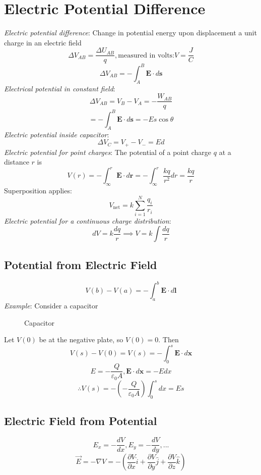 \section{Electric Potential Difference}
\emph{Electric potential difference}: Change in potential energy upon 
displacement a unit charge in an electric field
$$\Delta V_{AB}=\frac{\Delta U_{AB}}{q}, \text{measured in volts:} V=\frac{J}{C}$$
$$\Delta V_{AB} = - \int_A^B\mathbf{E}\cdot d\mathbf{s}$$
\emph{Electrical potential in constant field}:
$$\Delta V_{AB}=V_B-V_A=-\frac{W_{AB}}{q}$$
$$=-\int_A^B\mathbf{E}\cdot d\mathbf{s}=-Es\cos{\theta}$$
\emph{Electric potential inside capacitor}:
$$\Delta V_C = V_+ - V_- = Ed$$
\emph{Electric potential for point charges}: The potential of a point charge $q$ at a distance $r$ is
$$V(r)=-\int_\infty^r\mathbf{E}\cdot d\mathbf{r} = -\int_\infty^r\frac{kq}{r^2}dr=\frac{kq}{r}$$
Superposition applies:
$$V_{\text{net}}=k\sum_{i=1}^N\frac{q_i}{r_i}$$
\emph{Electric potential for a continuous charge distribution}:
$$dV=k\frac{dq}{r}\implies V=k\int\frac{dq}{r}$$
\subsection{Potential from Electric Field}
$$V(b) - V(a)=-\int_a^b\mathbf{E}\cdot d\mathbf{l}$$
\emph{Example}:
Consider a capacitor
\begin{figure}[H]
    \centering
    
    \caption{Capacitor}
\end{figure}
Let $V(0)$ be at the negative plate, so $V(0)=0$. Then
$$V(s)-V(0)=V(s)=-\int_0^s\mathbf{E}\cdot d\mathbf{x}$$
$$E=-\frac{Q}{\varepsilon_0A},\mathbf{E}\cdot d\mathbf{x}=-Edx$$
$$\therefore V(s)=-(-\frac{Q}{\varepsilon_0A})\int_0^sdx=Es$$
\subsection{Electric Field from Potential}
$$E_x=-\frac{dV}{dx}, E_y=-\frac{dV}{dy},...$$
$$\Vec{E}=-\nabla V=-(\frac{\partial V}{\partial x}\hat{i}+\frac{\partial V}{\partial y}\hat{j}+\frac{\partial V}{\partial z}\hat{k})$$
